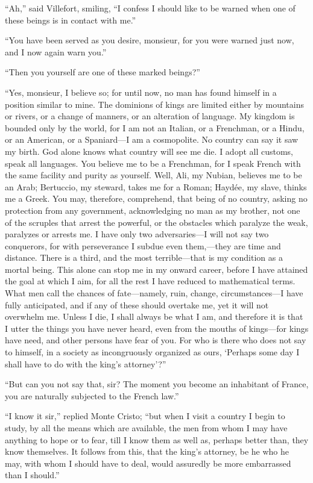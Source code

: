 “Ah,” said Villefort, smiling, “I confess I should like to be warned
when one of these beings is in contact with me.”

“You have been served as you desire, monsieur, for you were warned just
now, and I now again warn you.”

“Then you yourself are one of these marked beings?”

“Yes, monsieur, I believe so; for until now, no man has found himself
in a position similar to mine. The dominions of kings are limited
either by mountains or rivers, or a change of manners, or an alteration
of language. My kingdom is bounded only by the world, for I am not an
Italian, or a Frenchman, or a Hindu, or an American, or a Spaniard—I am
a cosmopolite. No country can say it saw my birth. God alone knows what
country will see me die. I adopt all customs, speak all languages. You
believe me to be a Frenchman, for I speak French with the same facility
and purity as yourself. Well, Ali, my Nubian, believes me to be an
Arab; Bertuccio, my steward, takes me for a Roman; Haydée, my slave,
thinks me a Greek. You may, therefore, comprehend, that being of no
country, asking no protection from any government, acknowledging no man
as my brother, not one of the scruples that arrest the powerful, or the
obstacles which paralyze the weak, paralyzes or arrests me. I have only
two adversaries—I will not say two conquerors, for with perseverance I
subdue even them,—they are time and distance. There is a third, and the
most terrible—that is my condition as a mortal being. This alone can
stop me in my onward career, before I have attained the goal at which I
aim, for all the rest I have reduced to mathematical terms. What men
call the chances of fate—namely, ruin, change, circumstances—I have
fully anticipated, and if any of these should overtake me, yet it will
not overwhelm me. Unless I die, I shall always be what I am, and
therefore it is that I utter the things you have never heard, even from
the mouths of kings—for kings have need, and other persons have fear of
you. For who is there who does not say to himself, in a society as
incongruously organized as ours, ‘Perhaps some day I shall have to do
with the king’s attorney’?”

“But can you not say that, sir? The moment you become an inhabitant of
France, you are naturally subjected to the French law.”

“I know it sir,” replied Monte Cristo; “but when I visit a country I
begin to study, by all the means which are available, the men from whom
I may have anything to hope or to fear, till I know them as well as,
perhaps better than, they know themselves. It follows from this, that
the king’s attorney, be he who he may, with whom I should have to deal,
would assuredly be more embarrassed than I should.”

